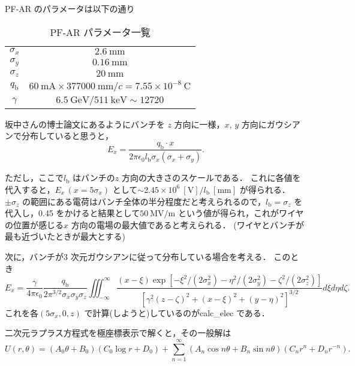 \documentclass{jsarticle}
\begin{document}
PF-AR のパラメータは以下の通り
\begin{table}[h]
\centering
\caption{PF-AR パラメータ一覧\label{tab:pfarparameter}}
\begin{tabular}{cc} \hline
$\sigma_x$ & $2.6~\mathrm{mm}$ \\ 
$\sigma_y$ & $0.16~\mathrm{mm}$ \\ 
$\sigma_z$ & $20~\mathrm{mm}$ \\ 
$q_\mathrm{b}$ & $60~\mathrm{mA} \times 377000~\mathrm{mm}/c = 7.55 \times 10^{-8}~\mathrm{C}$ \\
$\gamma$ & $6.5~\mathrm{GeV}/511~\mathrm{keV} \sim 12720$ \\ \hline
\end{tabular}
\end{table}

坂中さんの博士論文にあるようにバンチを $z$ 方向に一様，$x,\,y$ 方向にガウシアンで分布していると思うと，
\begin{equation}
E_x = \frac{q_\mathrm{b} \cdot x}{2\pi \epsilon_0 l_\mathrm{b}\sigma_x(\sigma_x + \sigma_y)}.
\end{equation}

ただし，ここで$l_\mathrm{b}$ はバンチの$z$ 方向の大きさのスケールである．
これに各値を代入すると，$E_x\,(x = 5\sigma_x)$ として$\sim 2.45 \times 10^6~[\mathrm{V}] /l_\mathrm{b}~[\mathrm{mm}]$ が得られる．
$\pm \sigma_z$ の範囲にある電荷はバンチ全体の半分程度だと考えられるので，$l_\mathrm{b} = \sigma_z$ を代入し，0.45 をかけると結果として$50~\mathrm{MV/m}$ という値が得られ，これがワイヤの位置が感じる$x$ 方向の電場の最大値であると考えられる．
(ワイヤとバンチが最も近づいたときが最大とする)

次に，バンチが3 次元ガウシアンに従って分布している場合を考える．
このとき
\begin{equation}
E_x = \frac{\gamma}{4\pi\epsilon_0}\frac{q_\mathrm{b}}{2\pi^{3/2}\sigma_x\sigma_y\sigma_z}\iiint_{-\infty}^\infty\frac{(x - \xi)\exp[-\xi^2/(2\sigma_x^2)-\eta^2/(2\sigma_y^2)-\zeta^2/(2\sigma_z^2)]}{[\gamma^2(z-\zeta)^2 + (x - \xi)^2 + (y - \eta)^2]^{3/2}}d\xi d\eta d\zeta.
\end{equation}
これを各$(5\sigma_x, 0, z)$ で計算(しようと)しているのがcalc\_elec である．

\newpage

二次元ラプラス方程式を極座標表示で解くと，その一般解は
\begin{equation}
U(r, \theta) = (A_0\theta + B_0)(C_0\log r + D_0)  + \sum_{n = 1}^\infty (A_n\cos n\theta + B_n\sin n\theta)(C_n r^n + D_n r^{-n}).
\end{equation}
\end{document}
